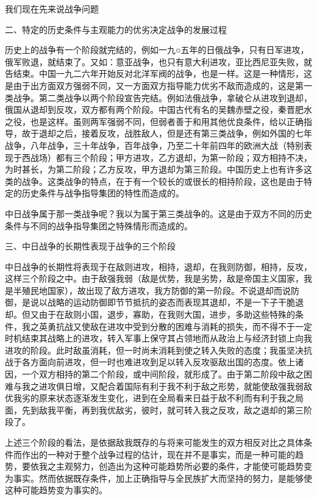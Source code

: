 我们现在先来说战争问题

二、特定的历史条件与主观能力的优劣决定战争的发展过程

历史上的战争有一个阶段就完结的，例如一九○五年的日俄战争，只有日军进攻，俄军败退，就结束了。又如：意亚战争，也只有意大利进攻，亚比西尼亚失败，就告结束。中国一九二六年开始反对北洋军阀的战争，也是一样。这是一种情形，这是由于出方面双方强弱不同，又一方面双方指导能力优劣不敌而造成的，这是第一类战争。第二类战争以两个阶段宣告完结。例如法俄战争，拿破仑从进攻到退却，俄国从退却到反攻，双方都有两个阶段。中国古代有名的吴魏赤壁之役，秦晋肥水之役，也是这样。虽则两军强弱不同，但弱者善于和用其他优良条件，给以正确指导，故于退却之后，接着反攻，战胜敌人，但是还有第三类战争，例如外国的七年战争，八年战争，三十年战争，百年战争，乃至二十年前四年的欧洲大战（特别表现于西战场）都有三个阶段；甲方进攻，乙方退却，为第一阶段；双方相持不决，为时甚长，为第二阶段；乙方反攻，甲方退却为第三阶段。中国历史上也有许多这类的战争。这类战争的特点，在于有一个较长的或很长的相持阶段，这也是由于特定的历史条件与战争指导集团的特性而造成的。

中日战争属于那一类战争呢？我以为属于第三类战争的。这是由于双方不同的历史条件与不同的战争指导集团之特殊情形而造成的。

三、中日战争的长期性表现于战争的三个阶段

中日战争的长期性将表现于在敌则进攻，相持，退却，在我则防御，相持，反攻，这样三个阶段之中。由于敌强我弱（敌是优势，我是劣势，敌是帝国主义国家，我是半殖民地国家），故出现了敌方进攻，我方防御的第一阶段。不说退却而说防御，是说以战略的运动防御即节节抵抗的姿态而表现其退却，不是一下子干脆退却。但又由于在敌则小国，退步，寡助，在我则大国，进步，多助这些特殊的条件，我之英勇抗战又使敌在进攻中受到分散的困难与消耗的损失，而不得不于一定时机结束其战略上的进攻，转入军事上保守其占领地而从政治上与经济封锁上向我进攻的阶段。此时敌虽消耗，但一时尚未消耗到使之转入失败的态度；我虽坚决抗战于各方面向前进攻，但一时也难进攻到足以转入反攻驱敌出国的态度。依上诸因，一个双方相持的第二个阶段，或中间阶段，就形成了。由于第二阶段中敌之困难与我之进攻俱日增，又配合着国际有利于我不利于敌之形势，就能使敌强我弱敌优我劣的原来状态逐渐发生变化，进到在全局看来日益于敌不利而有利于我之局面，先到敌我平衡，再到我优敌劣，彼时，就可转入我之反攻，敌之退却的第三阶段了。

上述三个阶段的看法，是依据敌我既存的与将来可能发生的双方相反对比之具体条件而作出的一种对于整个战争过程的估计，现在并不是事实，而是一种可能的趋势，要依我之主观努力，创造出为这种可能趋势所必要的条件，才能使可能趋势变为事实。然而依据既存条件，加上正确指导与全民族扩大而坚持的努力，是能够使这种可能趋势变为事实的。


